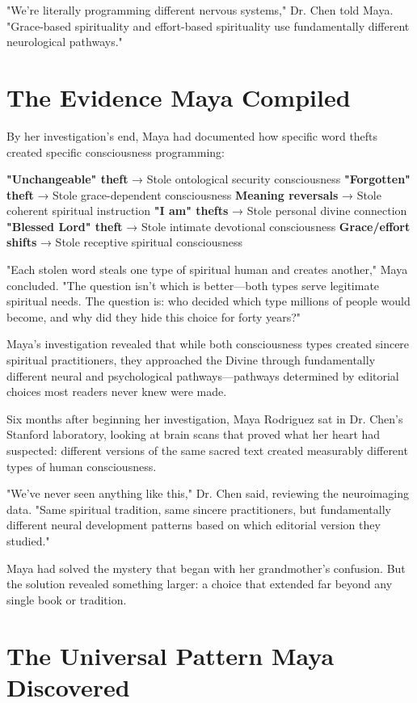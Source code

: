 \documentclass[11pt,twoside]{book}
\begin{document}
"We're literally programming different nervous systems," Dr. Chen told Maya. "Grace-based spirituality and effort-based spirituality use fundamentally different neurological pathways."
\section*{The Evidence Maya Compiled}
\label{sec:org13a192e}

By her investigation's end, Maya had documented how specific word thefts created specific consciousness programming:

\textbf{\textbf{"Unchangeable" theft}} → Stole ontological security consciousness
\textbf{\textbf{"Forgotten" theft}} → Stole grace-dependent consciousness  
\textbf{\textbf{Meaning reversals}} → Stole coherent spiritual instruction
\textbf{\textbf{"I am" thefts}} → Stole personal divine connection
\textbf{\textbf{"Blessed Lord" theft}} → Stole intimate devotional consciousness
\textbf{\textbf{Grace/effort shifts}} → Stole receptive spiritual consciousness

"Each stolen word steals one type of spiritual human and creates another," Maya concluded. "The question isn't which is better—both types serve legitimate spiritual needs. The question is: who decided which type millions of people would become, and why did they hide this choice for forty years?"

Maya's investigation revealed that while both consciousness types created sincere spiritual practitioners, they approached the Divine through fundamentally different neural and psychological pathways—pathways determined by editorial choices most readers never knew were made.

Six months after beginning her investigation, Maya Rodriguez sat in Dr. Chen's Stanford laboratory, looking at brain scans that proved what her heart had suspected: different versions of the same sacred text created measurably different types of human consciousness.

"We've never seen anything like this," Dr. Chen said, reviewing the neuroimaging data. "Same spiritual tradition, same sincere practitioners, but fundamentally different neural development patterns based on which editorial version they studied."

Maya had solved the mystery that began with her grandmother's confusion. But the solution revealed something larger: a choice that extended far beyond any single book or tradition.
\section*{The Universal Pattern Maya Discovered}
\label{sec:org546db30}
\end{document}
